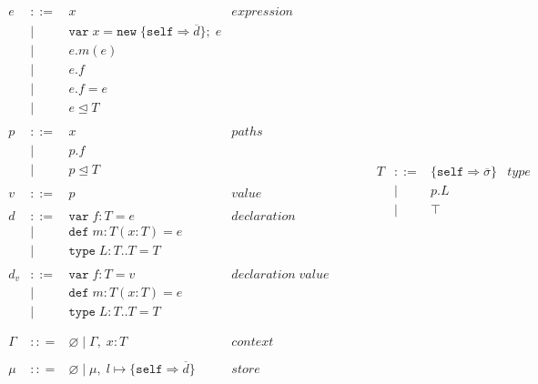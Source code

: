 \documentclass{llncs}
\begin{document}
\[
\begin{array}{lll}
\begin{array}{lllr}
e & ::= & x & expression \\
& | & \texttt{var} \; x = \texttt{new} \; \{\texttt{self} \Rightarrow \overline{d}\}; \; e&\\
& | & e.m(e) &\\
& | & e.f &\\
& | & e.f = e&\\
& | & e \unlhd T&\\
&&\\
p & ::= & x & paths \\
& | & p.f &\\
& | & p \unlhd T &\\
&&\\
v & ::= & p & value \\
&&\\
d & ::= & \texttt{var} \; f : T = e & declaration \\
  & |   & \texttt{def} \; m : T(x:T) = e &\\
  & |   & \texttt{type} \; L : T .. T = T &\\
&&\\
d_v & ::= & \texttt{var} \; f : T = v & declaration \; value \\
  & |   & \texttt{def} \; m : T(x:T) = e &\\
  & |   & \texttt{type} \; L : T .. T = T &\\
&&\\
&&\\
\Gamma & :: = & \varnothing \; | \; \Gamma, \; x : T & context \\
&&\\
\mu & :: = & \varnothing \; | \; \mu,\; l \mapsto \{\texttt{self} \Rightarrow \overline{d}\} & store \\
\end{array}
& ~~~~~~
&
\begin{array}{lllr}
T & ::= & \{\texttt{self} \Rightarrow \overline{\sigma}\} & type \\
& | & p.L &\\
& | & \top & \\

\end{array}
\end{array}\]
\end{document}

